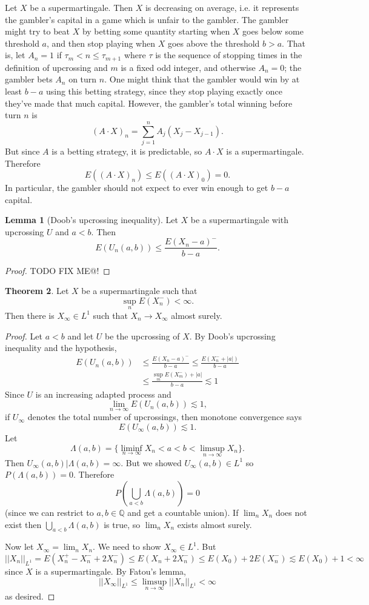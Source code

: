 \documentclass[12pt]{book}
\newcommand{\QQ}{\mathbb{Q}}
\theoremstyle{definition}
\newtheorem{theorem}{Theorem}[chapter]
\newtheorem{lemma}[theorem]{Lemma}
\begin{document}
Let $X$ be a supermartingale.
Then $X$ is decreasing on average, i.e. it represents the gambler's capital in a game which is unfair to the gambler.
The gambler might try to beat $X$ by betting some quantity starting when $X$ goes below some threshold $a$, and then stop playing when $X$ goes above the threshold $b > a$.
That is, let $A_n = 1$ if $\tau_m < n \leq \tau_{m+1}$ where $\tau$ is the sequence of stopping times in the definition of upcrossing and $m$ is a fixed odd integer, and otherwise $A_n = 0$; the gambler bets $A_n$ on turn $n$.
One might think that the gambler would win by at least $b - a$ using this betting strategy, since they stop playing exactly once they've made that much capital.
However, the gambler's total winning before turn $n$ is
$$(A \cdot X)_n = \sum_{j=1}^n A_j(X_j - X_{j-1}).$$
But since $A$ is a betting strategy, it is predictable, so $A \cdot X$ is a supermartingale.
Therefore
$$E((A \cdot X)_n) \leq E((A \cdot X)_0) = 0.$$
In particular, the gambler should not expect to ever win enough to get $b - a$ capital.

\begin{lemma}[Doob's upcrossing inequality]
Let $X$ be a supermartingale with upcrossing $U$ and $a < b$. Then
$$E(U_n(a, b)) \leq \frac{E(X_n - a)^-}{b - a}.$$
\end{lemma}
\begin{proof}
TODO FIX ME@!
\end{proof}

\begin{theorem}
Let $X$ be a supermartingale such that
$$\sup_n E(X_n^-) < \infty.$$
Then there is $X_\infty \in L^1$ such that $X_n \to X_\infty$ almost surely.
\end{theorem}
\begin{proof}
Let $a < b$ and let $U$ be the upcrossing of $X$.
By Doob's upcrossing inequality and the hypothesis,
\begin{align*}
E(U_n(a, b)) &\leq \frac{E(X_n - a)^-}{b - a} \leq \frac{E(X_n^- + |a|)}{b - a}\\
&\leq \frac{\sup_m E(X_m^-) + |a|}{b - a} \lesssim 1
\end{align*}
Since $U$ is an increasing adapted process and
$$\lim_{n \to \infty} E(U_n(a, b)) \lesssim 1,$$
if $U_\infty$ denotes the total number of upcrossings, then monotone convergence says
$$E(U_\infty(a, b)) \lesssim 1.$$
Let
$$\Lambda(a, b) = \{\liminf_{n \to \infty} X_n < a < b < \limsup_{n \to \infty} X_n\}.$$
Then $U_\infty(a, b)|\Lambda(a, b) = \infty$.
But we showed $U_\infty(a, b) \in L^1$ so $P(\Lambda(a, b)) = 0$.
Therefore
$$P\left(\bigcup_{a < b} \Lambda(a, b)\right) = 0$$
(since we can restrict to $a,b \in \QQ$ and get a countable union).
If $\lim_n X_n$ does not exist then $\bigcup_{a < b} \Lambda(a, b)$ is true, so $\lim_n X_n$ exists almost surely.

Now let $X_\infty = \lim_n X_n$. We need to show $X_\infty \in L^1$.
But
$$||X_n||_{L^1} = E(X_n^+ - X_n^- + 2X_n^-) \leq E(X_n + 2X_n^-) \leq E(X_0) + 2E(X_n^-) \lesssim E(X_0) + 1 < \infty$$
since $X$ is a supermartingale.
By Fatou's lemma,
$$||X_\infty||_{L^1} \leq \limsup_{n \to \infty} ||X_n||_{L^1} < \infty$$
as desired.
\end{proof}
\end{document}
